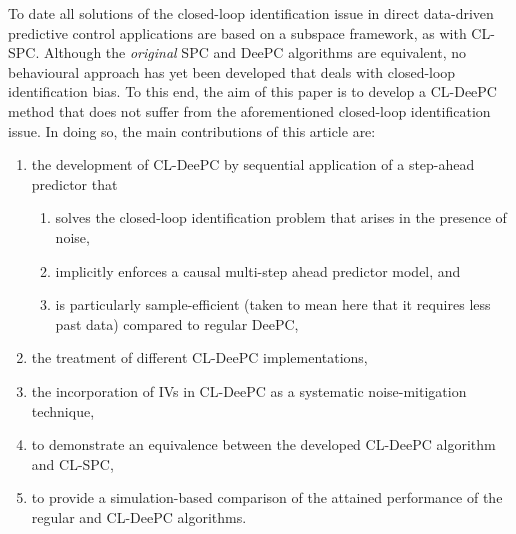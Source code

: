 %
To date all solutions of the closed-loop identification issue in direct data-driven predictive control applications are based on a subspace framework, as with \ac{CL-SPC}. Although the \textit{original} \ac{SPC} and \ac{DeePC} algorithms are equivalent, no behavioural approach has yet been developed that deals with closed-loop identification bias.  To this end, the aim of this paper is to develop a \ac{CL-DeePC} method that does not suffer from the aforementioned closed-loop identification issue. In doing so, the main contributions of this article are: %
\begin{enumerate}%
\item the development of \ac{CL-DeePC} by sequential application of a step-ahead predictor that
\begin{enumerate}
    \item solves the closed-loop identification problem that arises in the presence of noise, \label{contribution:solves_CL_issue}
    \item implicitly enforces a causal multi-step ahead predictor model, and \label{contribution:causality}
    \item is particularly sample-efficient (taken to mean here that it requires less past data) compared to regular \ac{DeePC}, \label{contribution:sample_efficient}%
\end{enumerate}
\item the treatment of different \ac{CL-DeePC} implementations,
\item the incorporation of \ac{IVs} in \ac{CL-DeePC} as a systematic noise-mitigation technique,
\item to demonstrate an equivalence between the developed \ac{CL-DeePC} algorithm and \ac{CL-SPC},
\item to provide a simulation-based comparison of the attained performance of the regular and \ac{CL-DeePC} algorithms.
\end{enumerate}